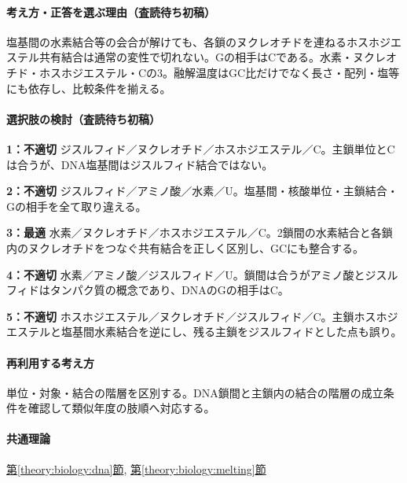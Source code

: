 \paragraph{考え方・正答を選ぶ理由（査読待ち初稿）} 塩基間の水素結合等の会合が解けても、各鎖のヌクレオチドを連ねるホスホジエステル共有結合は通常の変性で切れない。Gの相手はCである。水素・ヌクレオチド・ホスホジエステル・Cの3。融解温度はGC比だけでなく長さ・配列・塩等にも依存し、比較条件を揃える。

\paragraph{選択肢の検討（査読待ち初稿）}\mbox{}\par

\noindent\textbf{1：不適切} ジスルフィド／ヌクレオチド／ホスホジエステル／C。主鎖単位とCは合うが、DNA塩基間はジスルフィド結合ではない。\par

\noindent\textbf{2：不適切} ジスルフィド／アミノ酸／水素／U。塩基間・核酸単位・主鎖結合・Gの相手を全て取り違える。\par

\noindent\textbf{3：最適} 水素／ヌクレオチド／ホスホジエステル／C。2鎖間の水素結合と各鎖内のヌクレオチドをつなぐ共有結合を正しく区別し、GCにも整合する。\par

\noindent\textbf{4：不適切} 水素／アミノ酸／ジスルフィド／U。鎖間は合うがアミノ酸とジスルフィドはタンパク質の概念であり、DNAのGの相手はC。\par

\noindent\textbf{5：不適切} ホスホジエステル／ヌクレオチド／ジスルフィド／C。主鎖ホスホジエステルと塩基間水素結合を逆にし、残る主鎖をジスルフィドとした点も誤り。\par

\paragraph{再利用する考え方} 単位・対象・結合の階層を区別する。DNA鎖間と主鎖内の結合の階層の成立条件を確認して類似年度の肢順へ対応する。

\paragraph{共通理論} \hyperref[theory:biology:dna]{第\ref*{theory:biology:dna}節}, \hyperref[theory:biology:melting]{第\ref*{theory:biology:melting}節}

